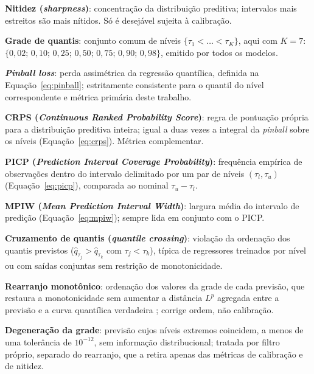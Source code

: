 \label{gl:nitidez}\textbf{Nitidez (\textit{sharpness})}: concentração da distribuição preditiva; intervalos mais estreitos são mais nítidos. Só é desejável sujeita à calibração.

\label{gl:grade}\textbf{Grade de quantis}: conjunto comum de níveis \(\{\tau_1 < \dots < \tau_K\}\), aqui com \(K = 7\): \(\{0{,}02;\,0{,}10;\,0{,}25;\,0{,}50;\,0{,}75;\,0{,}90;\,0{,}98\}\), emitido por todos os modelos.

\label{gl:pinball}\textbf{\textit{Pinball loss}}: perda assimétrica da regressão quantílica, definida na Equação~\ref{eq:pinball}; estritamente consistente para o quantil do nível correspondente e métrica primária deste trabalho.

\label{gl:crps}\textbf{CRPS (\textit{Continuous Ranked Probability Score})}: regra de pontuação própria para a distribuição preditiva inteira; igual a duas vezes a integral da \textit{pinball} sobre os níveis (Equação~\ref{eq:crps}). Métrica complementar.

\label{gl:picp}\textbf{PICP (\textit{Prediction Interval Coverage Probability})}: frequência empírica de observações dentro do intervalo delimitado por um par de níveis \((\tau_l, \tau_u)\) (Equação~\ref{eq:picp}), comparada ao nominal \(\tau_u - \tau_l\).

\label{gl:mpiw}\textbf{MPIW (\textit{Mean Prediction Interval Width})}: largura média do intervalo de predição (Equação~\ref{eq:mpiw}); sempre lida em conjunto com o PICP.

\label{gl:crossing}\textbf{Cruzamento de quantis (\textit{quantile crossing})}: violação da ordenação dos quantis previstos (\(\hat{q}_{\tau_j} > \hat{q}_{\tau_k}\) com \(\tau_j < \tau_k\)), típica de regressores treinados por nível ou com saídas conjuntas sem restrição de monotonicidade.

\label{gl:rearranjo}\textbf{Rearranjo monotônico}: ordenação dos valores da grade de cada previsão, que restaura a monotonicidade sem aumentar a distância \(L^p\) agregada entre a previsão e a curva quantílica verdadeira \cite{CHERNOZHUKOV2010REARRANGEMENT}; corrige ordem, não calibração.

\label{gl:degeneracao}\textbf{Degeneração da grade}: previsão cujos níveis extremos coincidem, a menos de uma tolerância de \(10^{-12}\), sem informação distribucional; tratada por filtro próprio, separado do rearranjo, que a retira apenas das métricas de calibração e de nitidez.

